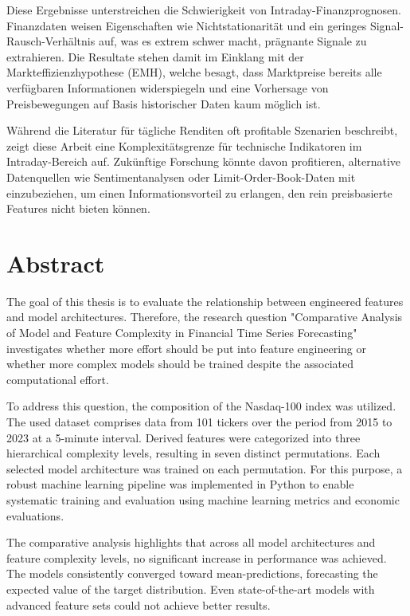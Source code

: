 \documentclass[12pt,twoside=false,a4paper,parskip]{scrbook}
\begin{document}
Diese Ergebnisse unterstreichen die Schwierigkeit von Intraday-Finanzprognosen. Finanzdaten weisen Eigenschaften wie Nichtstationarität und ein geringes Signal-Rausch-Verhältnis auf, was es extrem schwer macht, prägnante Signale zu extrahieren. Die Resultate stehen damit im Einklang mit der Markteffizienzhypothese (EMH), welche besagt, dass Marktpreise bereits alle verfügbaren Informationen widerspiegeln und eine Vorhersage von Preisbewegungen auf Basis historischer Daten kaum möglich ist.

Während die Literatur für tägliche Renditen oft profitable Szenarien beschreibt, zeigt diese Arbeit eine Komplexitätsgrenze für technische Indikatoren im Intraday-Bereich auf. Zukünftige Forschung könnte davon profitieren, alternative Datenquellen wie Sentimentanalysen oder Limit-Order-Book-Daten mit einzubeziehen, um einen Informationsvorteil zu erlangen, den rein preisbasierte Features nicht bieten können.

\chapter*{Abstract}

The goal of this thesis is to evaluate the relationship between engineered features and model architectures. Therefore, the research question "Comparative Analysis of Model and Feature Complexity in Financial Time Series Forecasting" investigates whether more effort should be put into feature engineering or whether more complex models should be trained despite the associated computational effort. 

To address this question, the composition of the Nasdaq-100 index was utilized. The used dataset comprises data from 101 tickers over the period from 2015 to 2023 at a 5-minute interval. Derived features were categorized into three hierarchical complexity levels, resulting in seven distinct permutations. Each selected model architecture was trained on each permutation. For this purpose, a robust machine learning pipeline was implemented in Python to enable systematic training and evaluation using machine learning metrics and economic evaluations.

The comparative analysis highlights that across all model architectures and feature complexity levels, no significant increase in performance was achieved. The models consistently converged toward mean-predictions, forecasting the expected value of the target distribution. Even state-of-the-art models with advanced feature sets could not achieve better results.
\end{document}
